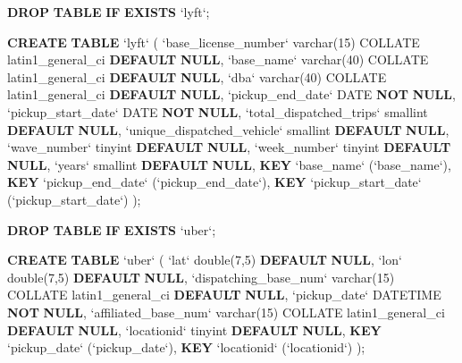 \documentclass[12pt,twoside]{reedthesis}
\newenvironment{Shaded}{\begin{snugshade}}{\end{snugshade}}
\newcommand{\KeywordTok}[1]{\textcolor[rgb]{0.13,0.29,0.53}{\textbf{#1}}}
\newcommand{\DataTypeTok}[1]{\textcolor[rgb]{0.13,0.29,0.53}{#1}}
\newcommand{\DecValTok}[1]{\textcolor[rgb]{0.00,0.00,0.81}{#1}}
\newcommand{\NormalTok}[1]{#1}
\theoremstyle{definition}
\theoremstyle{definition}
\theoremstyle{definition}
\theoremstyle{remark}
\begin{document}
\begin{Shaded}
\begin{Highlighting}[]
\KeywordTok{DROP} \KeywordTok{TABLE} \KeywordTok{IF} \KeywordTok{EXISTS}\NormalTok{ `lyft`;}

\KeywordTok{CREATE} \KeywordTok{TABLE}\NormalTok{ `lyft` (}
\NormalTok{ `base_license_number` }\DataTypeTok{varchar}\NormalTok{(}\DecValTok{15}\NormalTok{) COLLATE latin1_general_ci }\KeywordTok{DEFAULT} \KeywordTok{NULL}\NormalTok{,}
\NormalTok{ `base_name` }\DataTypeTok{varchar}\NormalTok{(}\DecValTok{40}\NormalTok{) COLLATE latin1_general_ci }\KeywordTok{DEFAULT} \KeywordTok{NULL}\NormalTok{,}
\NormalTok{ `dba` }\DataTypeTok{varchar}\NormalTok{(}\DecValTok{40}\NormalTok{) COLLATE latin1_general_ci }\KeywordTok{DEFAULT} \KeywordTok{NULL}\NormalTok{,}
\NormalTok{ `pickup_end_date` }\DataTypeTok{DATE} \KeywordTok{NOT} \KeywordTok{NULL}\NormalTok{,}
\NormalTok{ `pickup_start_date` }\DataTypeTok{DATE} \KeywordTok{NOT} \KeywordTok{NULL}\NormalTok{,}
\NormalTok{ `total_dispatched_trips` }\DataTypeTok{smallint} \KeywordTok{DEFAULT} \KeywordTok{NULL}\NormalTok{,}
\NormalTok{ `unique_dispatched_vehicle` }\DataTypeTok{smallint} \KeywordTok{DEFAULT} \KeywordTok{NULL}\NormalTok{,}
\NormalTok{ `wave_number` tinyint }\KeywordTok{DEFAULT} \KeywordTok{NULL}\NormalTok{,}
\NormalTok{ `week_number` tinyint }\KeywordTok{DEFAULT} \KeywordTok{NULL}\NormalTok{,}
\NormalTok{ `years` }\DataTypeTok{smallint} \KeywordTok{DEFAULT} \KeywordTok{NULL}\NormalTok{,}
 \KeywordTok{KEY}\NormalTok{ `base_name` (`base_name`),}
 \KeywordTok{KEY}\NormalTok{ `pickup_end_date` (`pickup_end_date`),}
 \KeywordTok{KEY}\NormalTok{ `pickup_start_date` (`pickup_start_date`)}
\NormalTok{);}


\KeywordTok{DROP} \KeywordTok{TABLE} \KeywordTok{IF} \KeywordTok{EXISTS}\NormalTok{ `uber`;}

\KeywordTok{CREATE} \KeywordTok{TABLE}\NormalTok{ `uber` (}
\NormalTok{ `lat` }\DataTypeTok{double}\NormalTok{(}\DecValTok{7}\NormalTok{,}\DecValTok{5}\NormalTok{) }\KeywordTok{DEFAULT} \KeywordTok{NULL}\NormalTok{,}
\NormalTok{ `lon` }\DataTypeTok{double}\NormalTok{(}\DecValTok{7}\NormalTok{,}\DecValTok{5}\NormalTok{) }\KeywordTok{DEFAULT} \KeywordTok{NULL}\NormalTok{,}
\NormalTok{ `dispatching_base_num` }\DataTypeTok{varchar}\NormalTok{(}\DecValTok{15}\NormalTok{) COLLATE latin1_general_ci }\KeywordTok{DEFAULT} \KeywordTok{NULL}\NormalTok{,}
\NormalTok{ `pickup_date` DATETIME }\KeywordTok{NOT} \KeywordTok{NULL}\NormalTok{,}
\NormalTok{ `affiliated_base_num` }\DataTypeTok{varchar}\NormalTok{(}\DecValTok{15}\NormalTok{) COLLATE latin1_general_ci }\KeywordTok{DEFAULT} \KeywordTok{NULL}\NormalTok{,}
\NormalTok{ `locationid` tinyint }\KeywordTok{DEFAULT} \KeywordTok{NULL}\NormalTok{,}
 \KeywordTok{KEY}\NormalTok{ `pickup_date` (`pickup_date`),}
 \KeywordTok{KEY}\NormalTok{ `locationid` (`locationid`)}
\NormalTok{);}


\end{Highlighting}
\end{Shaded}
\end{document}
